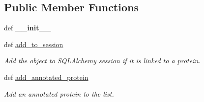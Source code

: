 \subsection*{Public Member Functions}
\begin{DoxyCompactItemize}
\item 
\hypertarget{classsrc_1_1fr_1_1tagc_1_1rainet_1_1core_1_1data_1_1CorumCluster_1_1CorumCluster_ae945d7c9dbac5803b9cd9a5ba0888837}{def {\bfseries \-\_\-\-\_\-init\-\_\-\-\_\-}}\label{classsrc_1_1fr_1_1tagc_1_1rainet_1_1core_1_1data_1_1CorumCluster_1_1CorumCluster_ae945d7c9dbac5803b9cd9a5ba0888837}

\item 
\hypertarget{classsrc_1_1fr_1_1tagc_1_1rainet_1_1core_1_1data_1_1CorumCluster_1_1CorumCluster_a1e899e59d0ea4f49ed07fdbaf23d0ad7}{def \hyperlink{classsrc_1_1fr_1_1tagc_1_1rainet_1_1core_1_1data_1_1CorumCluster_1_1CorumCluster_a1e899e59d0ea4f49ed07fdbaf23d0ad7}{add\-\_\-to\-\_\-session}}\label{classsrc_1_1fr_1_1tagc_1_1rainet_1_1core_1_1data_1_1CorumCluster_1_1CorumCluster_a1e899e59d0ea4f49ed07fdbaf23d0ad7}

\begin{DoxyCompactList}\small\item\em Add the object to S\-Q\-L\-Alchemy session if it is linked to a protein. \end{DoxyCompactList}\item 
\hypertarget{classsrc_1_1fr_1_1tagc_1_1rainet_1_1core_1_1data_1_1CorumCluster_1_1CorumCluster_a0e8f530271c6ea21a5ef2b9f2b2c5d58}{def \hyperlink{classsrc_1_1fr_1_1tagc_1_1rainet_1_1core_1_1data_1_1CorumCluster_1_1CorumCluster_a0e8f530271c6ea21a5ef2b9f2b2c5d58}{add\-\_\-annotated\-\_\-protein}}\label{classsrc_1_1fr_1_1tagc_1_1rainet_1_1core_1_1data_1_1CorumCluster_1_1CorumCluster_a0e8f530271c6ea21a5ef2b9f2b2c5d58}

\begin{DoxyCompactList}\small\item\em Add an annotated protein to the list. \end{DoxyCompactList}\end{DoxyCompactItemize}
